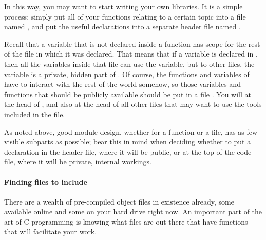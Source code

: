 In this way, you may want to start writing your own libraries. It is a simple
process: simply put all of your functions relating to a certain topic
into a file named , and put the useful declarations
into a separate header file named .

Recall that a variable that is not declared inside a function has scope
for the rest of the file in which it was declared. That means that if a
variable is declared in , then all the variables inside
that file can use the variable, but to other  files, the
variable is a private, hidden part of . Of course, the
functions and variables of  have to interact with the
rest of the world somehow, so those variables and functions that should
be publicly available should be put in a file . You
will  at the head of ,
and also at the head of all other files that may want to use the tools
included in the  file.

As noted above, good module design, whether for a function or a file, has as few
visible subparts as possible; bear this in mind when deciding whether to put a
declaration in the header file, where it will be public, or at the top of the code file,
where it will be private, internal workings.
\paragraph{\treesymbol{} Finding files to include}    
There are a wealth of pre-compiled object files in existence already,
some available online and some on your hard drive right now.  An
important part of the art of C programming is knowing what files are
out there that have functions that will facilitate your work. 

